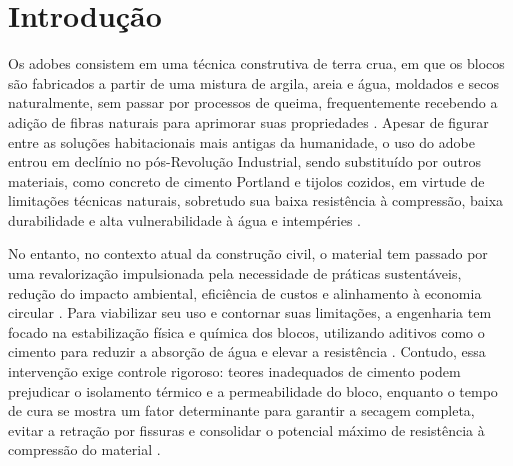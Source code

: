 \chapter{Introdução}

Os adobes consistem em uma técnica construtiva de terra crua, em que os blocos são fabricados a partir de uma mistura de argila, areia e água, moldados e secos naturalmente, sem passar por processos de queima, frequentemente recebendo a adição de fibras naturais para aprimorar suas propriedades \cite{Bailly2024, Junior2020, Dormohamadi2024, Morel2021}. Apesar de figurar entre as soluções habitacionais mais antigas da humanidade, o uso do adobe entrou em declínio no pós-Revolução Industrial, sendo substituído por outros materiais, como concreto de cimento Portland e tijolos cozidos, em virtude de limitações técnicas naturais, sobretudo sua baixa resistência à compressão, baixa durabilidade e alta vulnerabilidade à água e intempéries \cite{Junior2020, Morel2021, Rocco2024, Sharma2016, VanDerLinden2019}.

No entanto, no contexto atual da construção civil, o material tem passado por uma revalorização impulsionada pela necessidade de práticas sustentáveis, redução do impacto ambiental, eficiência de custos e alinhamento à economia circular \cite{Bailly2024, Morel2021, VanDerLinden2019}. Para viabilizar seu uso e contornar suas limitações, a engenharia tem focado na estabilização física e química dos blocos, utilizando aditivos como o cimento para reduzir a absorção de água e elevar a resistência \cite{Bailly2024, Dormohamadi2024, Sharma2016, Kariyawasam2016}. Contudo, essa intervenção exige controle rigoroso: teores inadequados de cimento podem prejudicar o isolamento térmico e a permeabilidade do bloco, enquanto o tempo de cura se mostra um fator determinante para garantir a secagem completa, evitar a retração por fissuras e consolidar o potencial máximo de resistência à compressão do material \cite{Bailly2024}.

